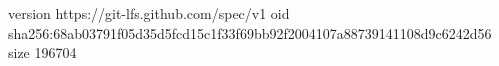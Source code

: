 version https://git-lfs.github.com/spec/v1
oid sha256:68ab03791f05d35d5fcd15c1f33f69bb92f2004107a88739141108d9c6242d56
size 196704
